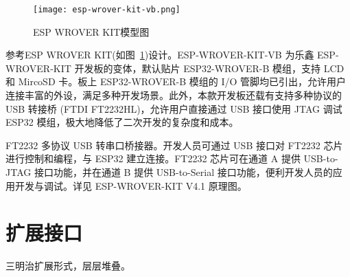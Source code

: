 \begin{figure}[htbp]
    \centering
    \texttt{[image: esp-wrover-kit-vb.png]}
    \caption{ESP WROVER KIT模型图}
    \label{fig:ESP32-WROVER}
\end{figure}

参考ESP WROVER KIT(如图~\ref{fig:ESP32-WROVER})设计。ESP-WROVER-KIT-VB 为乐鑫 ESP-WROVER-KIT 开发板的变体，默认贴片 ESP32-WROVER-B 模组，支持 LCD 和 MircoSD 卡。板上 ESP32-WROVER-B 模组的 I/O 管脚均已引出，允许用户连接丰富的外设，满足多种开发场景。此外，本款开发板还载有支持多种协议的 USB 转接桥 (FTDI FT2232HL)，允许用户直接通过 USB 接口使用 JTAG 调试 ESP32 模组，极大地降低了二次开发的复杂度和成本。

FT2232 多协议 USB 转串口桥接器。开发人员可通过 USB 接口对 FT2232 芯片进行控制和编程，与 ESP32 建立连接。FT2232 芯片可在通道 A 提供 USB-to-JTAG 接口功能，并在通道 B 提供 USB-to-Serial 接口功能，便利开发人员的应用开发与调试。详见 ESP-WROVER-KIT V4.1 原理图。



\section{扩展接口}

三明治扩展形式，层层堆叠。

